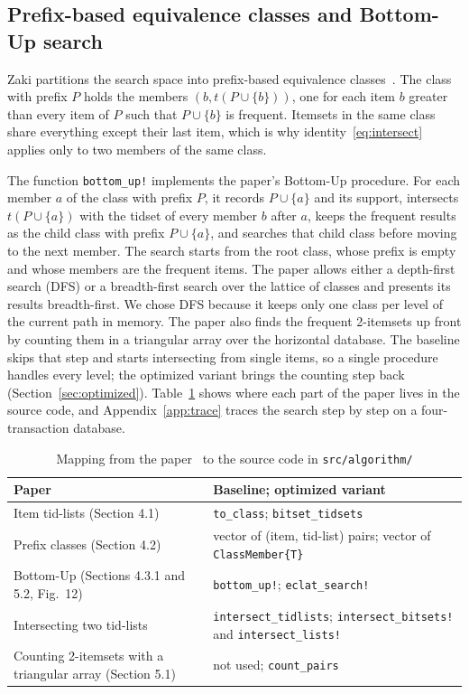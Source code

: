 \subsection{Prefix-based equivalence classes and Bottom-Up search}
Zaki partitions the search space into prefix-based equivalence
classes~\cite{zaki2000}. The class with prefix $P$ holds the members
$(b, t(P \cup \{b\}))$, one for each item $b$ greater than every item of $P$ such that
$P \cup \{b\}$ is frequent. Itemsets in the same class share everything except their
last item, which is why identity~\eqref{eq:intersect} applies only to two members of the
same class.

The function \texttt{bottom\_up!} implements the paper's Bottom-Up procedure. For each
member $a$ of the class with prefix $P$, it records $P \cup \{a\}$ and its support,
intersects $t(P \cup \{a\})$ with the tidset of every member $b$ after $a$, keeps the
frequent results as the child class with prefix $P \cup \{a\}$, and searches that child
class before moving to the next member. The search starts from the root class, whose
prefix is empty and whose members are the frequent items. The paper allows either a
depth-first search (DFS) or a breadth-first search over the lattice of classes and
presents its results breadth-first. We chose DFS because it keeps only one class per level
of the current path in memory. The paper also finds the frequent 2-itemsets up front by
counting them in a triangular array over the horizontal database. The baseline skips that
step and starts intersecting from single items, so a single procedure handles every
level; the optimized variant brings the counting step back
(Section~\ref{sec:optimized}). Table~\ref{tab:mapping} shows where each part of the paper
lives in the source code, and Appendix~\ref{app:trace} traces the search step by step on a
four-transaction database.

\begin{table}[t]
\centering
\small
\caption{Mapping from the paper~\cite{zaki2000} to the source code in \texttt{src/algorithm/}}
\label{tab:mapping}
\begin{tabular}{>{\raggedright\arraybackslash}p{}>{\raggedright\arraybackslash}p{}}
\hline
Paper & Baseline; optimized variant \\
\hline
Item tid-lists (Section 4.1) & \texttt{to\_class}; \texttt{bitset\_tidsets} \\
Prefix classes (Section 4.2) & vector of (item, tid-list) pairs; vector of
\texttt{ClassMember\{T\}} \\
Bottom-Up (Sections 4.3.1 and 5.2, Fig.~12) & \texttt{bottom\_up!}; \texttt{eclat\_search!} \\
Intersecting two tid-lists & \texttt{intersect\_tidlists}; \texttt{intersect\_bitsets!} and
\texttt{intersect\_lists!} \\
Counting 2-itemsets with a triangular array (Section 5.1) & not used; \texttt{count\_pairs} \\
\hline
\end{tabular}
\end{table}

